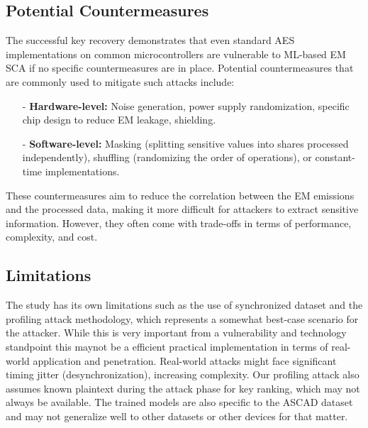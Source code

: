\documentclass[runningheads]{llncs}
\begin{document}
\subsection{Potential Countermeasures}
The successful key recovery demonstrates that even standard AES implementations on common microcontrollers are vulnerable to ML-based EM SCA if no specific countermeasures are in place. Potential countermeasures that are commonly used to mitigate such attacks include:
\begin{itemize}
    \item[-]\textbf{Hardware-level:} Noise generation, power supply randomization, specific chip design to reduce EM leakage, shielding.
    \item[-]\textbf{Software-level:} Masking (splitting sensitive values into shares processed independently), shuffling (randomizing the order of operations), or constant-time implementations.
\end{itemize}
These countermeasures aim to reduce the correlation between the EM emissions and the processed data, making it more difficult for attackers to extract sensitive information. However, they often come with trade-offs in terms of performance, complexity, and cost. 

\subsection{Limitations}
The study has its own limitations such as the use of synchronized dataset and the profiling attack methodology, which represents a somewhat best-case scenario for the attacker. While this is very important from a vulnerability and technology standpoint this maynot be a efficient practical implementation in terms of real-world application and penetration. Real-world attacks might face significant timing jitter (desynchronization), increasing complexity. Our profiling attack also assumes known plaintext during the attack phase for key ranking, which may not always be available. The trained models are also specific to the ASCAD dataset and may not generalize well to other datasets or other devices for that matter.
\end{document}
